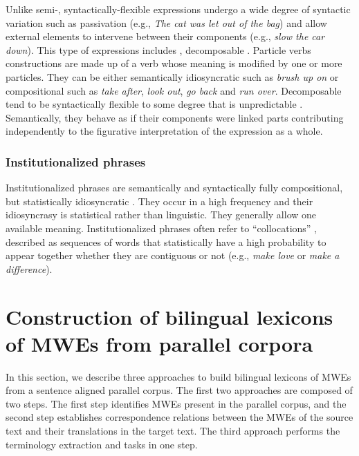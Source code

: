 \documentclass[output=paper,modfonts,nonflat]{langsci/langscibook}
\begin{document}
Unlike semi-, syntactically-flexible expressions undergo a wide degree of syntactic variation such as passivation (e.g., \textit{The cat was let out of the bag}) and allow external elements to intervene between their components (e.g., \textit{slow the car down}). This type of expressions includes , decomposable . 
Particle verbs constructions are made up of a verb whose meaning is modified by one or more particles. They can be either semantically idiosyncratic such as \textit{brush up on}  or compositional such as \textit{take after}, \textit{look out}, \textit{go back} and \textit{run over}.
Decomposable  tend to be syntactically flexible to some degree that is unpredictable \citep{riehemann01}. Semantically, they behave as if their components were linked parts contributing independently to the figurative interpretation of the expression as a whole.

\subsubsection{Institutionalized phrases}\label{sec:semmar:3.3}
Institutionalized phrases are semantically and syntactically fully compositional, but statistically idiosyncratic \citep{sag02}. They occur in a high frequency and their idiosyncrasy is statistical rather than linguistic. They generally allow one available meaning. Institutionalized phrases often refer to “collocations” \citep{barz1996komposition,riehemann01,burger2010phraseologie}, described as sequences of words that statistically have a high probability to appear together whether they are contiguous or not (e.g., \textit{make love} or \textit{make a difference}).

\section{Construction of bilingual lexicons of MWEs from parallel corpora}\label{sec:semmar:4}


In this section, we describe three approaches to build bilingual lexicons of MWEs from a
sentence aligned parallel corpus. The first two approaches are composed of two steps. The first step identifies MWEs present in the parallel corpus, and the second step establishes correspondence relations between the MWEs of the source text and their translations in the target text. The third approach performs the terminology extraction and  tasks in one step. 
\end{document}
